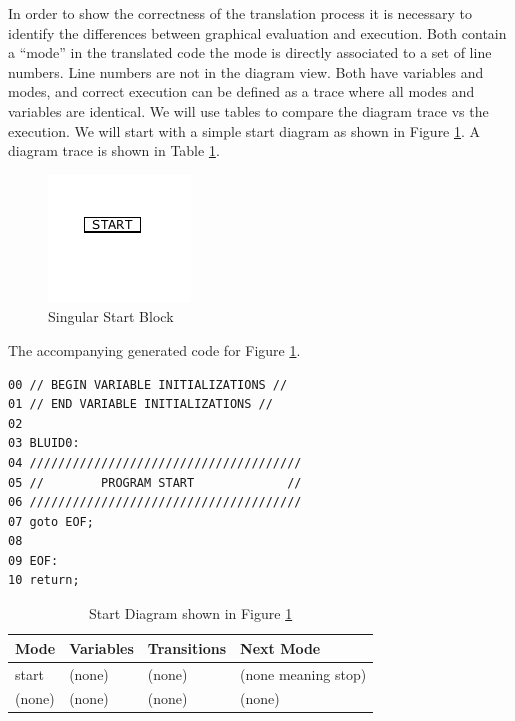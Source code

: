 In order to show the correctness of the translation process it is necessary to identify the differences between graphical evaluation and execution. Both contain a ``mode'' in the translated code the mode is directly associated to a set of line numbers. Line numbers are not in the diagram view. Both have variables and modes, and correct execution can be defined as a trace where all modes and variables are identical. We will use tables to compare the diagram trace vs the execution. We will start with a simple start diagram as shown in Figure \ref{fig:correctness_ex_start}.
A diagram trace is shown in Table \ref{table:BasicDiagOnly}. 

\begin{figure}[h]
	\centering
	\includegraphics[width=\imgsmall]{./images/correctness_ex_start.png}
	\caption{Singular Start Block}
	\label{fig:correctness_ex_start}
\end{figure}


The accompanying generated  code for Figure \ref{fig:correctness_ex_start}.

\begin{lstlisting}[frame=single]
00 // BEGIN VARIABLE INITIALIZATIONS //
01 // END VARIABLE INITIALIZATIONS //
02
03 BLUID0:
04 //////////////////////////////////////
05 //        PROGRAM START             //
06 //////////////////////////////////////
07 goto EOF;
08 
09 EOF:
10 return;
\end{lstlisting}

\begin{table}[htcb]
	\caption{Start Diagram shown in Figure \ref{fig:correctness_ex_start}}
	\centering
		\begin{tabular}{| l | l | l | l |}
			\hline
			\textbf{Mode} & \textbf{Variables} & \textbf{Transitions} & \textbf{Next Mode} \\
			\hline
			start & (none) & (none) & (none meaning stop) \\
			\hline
			(none) & (none) & (none) & (none) \\
			\hline
		\end{tabular}
	\label{table:BasicDiagOnly}
\end{table}

